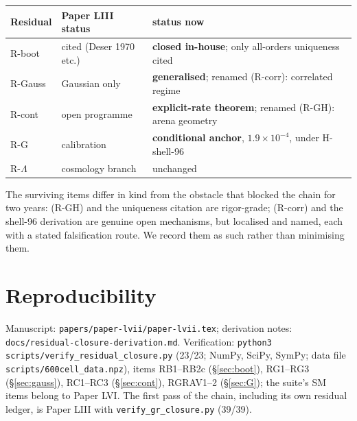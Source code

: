 \documentclass[12pt]{article}
\theoremstyle{definition}
\theoremstyle{remark}
\begin{document}
\begin{center}
\begin{tabular}{lll}
\toprule
Residual & Paper LIII status & status now \\
\midrule
R-boot & cited (Deser 1970 etc.) & \textbf{closed in-house}; only all-orders uniqueness cited \\
R-Gauss & Gaussian only & \textbf{generalised}; renamed (R-corr): correlated regime \\
R-cont & open programme & \textbf{explicit-rate theorem}; renamed (R-GH): arena geometry \\
R-G & calibration & \textbf{conditional anchor}, $1.9\times10^{-4}$, under H-shell-96 \\
R-$\Lambda$ & cosmology branch & unchanged \\
\bottomrule
\end{tabular}
\end{center}

The surviving items differ in kind from the obstacle that blocked the chain for two years: (R-GH) and the uniqueness citation are rigor-grade; (R-corr) and the shell-96 derivation are genuine open mechanisms, but localised and named, each with a stated falsification route. We record them as such rather than minimising them.

\section{Reproducibility}\label{sec:repro}

Manuscript: \texttt{papers/paper-lvii/paper-lvii.tex}; derivation notes: \texttt{docs/residual-closure-derivation.md}. Verification: \texttt{python3 scripts/verify\_residual\_closure.py} (23/23; NumPy, SciPy, SymPy; data file \texttt{scripts/600cell\_data.npz}), items RB1--RB2c (\S\ref{sec:boot}), RG1--RG3 (\S\ref{sec:gauss}), RC1--RC3 (\S\ref{sec:cont}), RGRAV1--2 (\S\ref{sec:G}); the suite's SM items belong to Paper LVI. The first pass of the chain, including its own residual ledger, is Paper LIII with \texttt{verify\_gr\_closure.py} (39/39).



\end{document}
